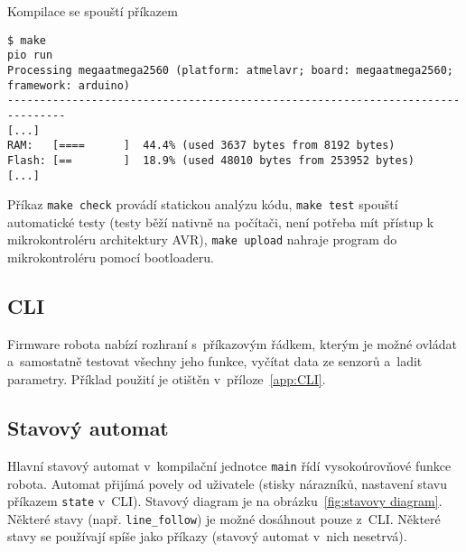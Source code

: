 \documentclass[a4paper,11pt]{article}
\begin{document}
Kompilace se spouští příkazem
\begin{lstlisting}[style=terminal]
$ make
pio run
Processing megaatmega2560 (platform: atmelavr; board: megaatmega2560; framework: arduino)
-------------------------------------------------------------------------------
[...]
RAM:   [====      ]  44.4% (used 3637 bytes from 8192 bytes)
Flash: [==        ]  18.9% (used 48010 bytes from 253952 bytes)
[...]
\end{lstlisting}
Příkaz \texttt{make check} provádí statickou analýzu kódu, \texttt{make test}
spouští automatické testy (testy běží nativně na počítači, není potřeba mít
přístup k mikrokontroléru architektury AVR), \texttt{make upload} nahraje
program do mikrokontroléru pomocí bootloaderu.


\subsection{CLI}
Firmware robota nabízí rozhraní s~příkazovým řádkem, kterým je možné
ovládat a~samostatně testovat všechny jeho funkce, vyčítat data ze
senzorů a~ladit parametry. Příklad použití je otištěn
v~příloze~\ref{app:CLI}.


\subsection{Stavový automat}
Hlavní stavový automat v~kompilační jednotce \texttt{main} řídí vysokoúrovňové
funkce robota. Automat přijímá povely od uživatele (stisky nárazníků, nastavení
stavu příkazem \texttt{state} v~CLI). Stavový diagram je na
obrázku~\ref{fig:stavovy diagram}. Některé stavy (např. \texttt{line\_follow})
je možné dosáhnout pouze z~CLI. Některé stavy se používají spíše jako příkazy
(stavový automat v~nich nesetrvá).
\end{document}
